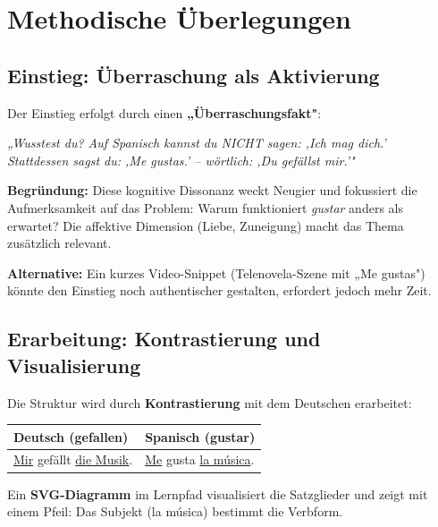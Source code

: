 \documentclass[11pt, a4paper]{article}
\newcommand{\es}[1]{\textcolor{spanisch}{\textit{#1}}}
\begin{document}

\section{Methodische Überlegungen}

\subsection{Einstieg: Überraschung als Aktivierung}

Der Einstieg erfolgt durch einen \textbf{„Überraschungsfakt"}:

\begin{infobox}
    \textit{„Wusstest du? Auf Spanisch kannst du NICHT sagen: ‚Ich mag dich.' \\
    Stattdessen sagst du: ‚Me gustas.' -- wörtlich: ‚Du gefällst mir.'"}
\end{infobox}

\textbf{Begründung:} Diese kognitive Dissonanz weckt Neugier und fokussiert die Aufmerksamkeit auf das Problem: Warum funktioniert \es{gustar} anders als erwartet? Die affektive Dimension (Liebe, Zuneigung) macht das Thema zusätzlich relevant.

\textbf{Alternative:} Ein kurzes Video-Snippet (Telenovela-Szene mit „Me gustas") könnte den Einstieg noch authentischer gestalten, erfordert jedoch mehr Zeit.

\subsection{Erarbeitung: Kontrastierung und Visualisierung}

Die Struktur wird durch \textbf{Kontrastierung} mit dem Deutschen erarbeitet:

\begin{center}
\begin{tabular}{|l|l|}
    \hline
    \textbf{Deutsch (gefallen)} & \textbf{Spanisch (gustar)} \\
    \hline
    \underline{Mir} gefällt \underline{die Musik}. & \underline{Me} gusta \underline{la música}. \\
    \hline
\end{tabular}
\end{center}

Ein \textbf{SVG-Diagramm} im Lernpfad visualisiert die Satzglieder und zeigt mit einem Pfeil: Das Subjekt (la música) bestimmt die Verbform.
\end{document}
